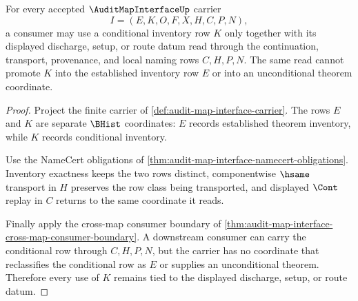 \begin{theorem}
\label{thm:audit-map-interface-conditional-row-discharge-boundary}
For every accepted $\AuditMapInterfaceUp$ carrier
$$
I=(E,K,O,F,X,H,C,P,N),
$$
a consumer may use a conditional inventory row $K$ only together with its displayed discharge, setup, or route datum read through the continuation, transport, provenance, and local naming rows $C,H,P,N$. The same read cannot promote $K$ into the established inventory row $E$ or into an unconditional theorem coordinate.
\end{theorem}
\begin{proof}
Project the finite carrier of \autoref{def:audit-map-interface-carrier}. The rows $E$ and $K$ are separate $\BHist$ coordinates: $E$ records established theorem inventory, while $K$ records conditional inventory.

Use the NameCert obligations of \autoref{thm:audit-map-interface-namecert-obligations}. Inventory exactness keeps the two rows distinct, componentwise $\hsame$ transport in $H$ preserves the row class being transported, and displayed $\Cont$ replay in $C$ returns to the same coordinate it reads.

Finally apply the cross-map consumer boundary of \autoref{thm:audit-map-interface-cross-map-consumer-boundary}. A downstream consumer can carry the conditional row through $C,H,P,N$, but the carrier has no coordinate that reclassifies the conditional row as $E$ or supplies an unconditional theorem. Therefore every use of $K$ remains tied to the displayed discharge, setup, or route datum.
\end{proof}

